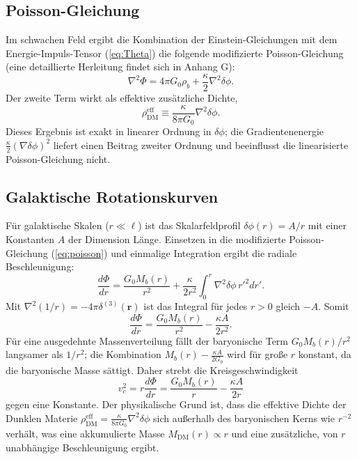 \documentclass[12pt,a4paper]{article}
\begin{document}
	\subsection{Poisson-Gleichung}
	Im schwachen Feld ergibt die Kombination der Einstein-Gleichungen mit dem Energie-Impuls-Tensor (\ref{eq:Theta}) die folgende modifizierte Poisson-Gleichung (eine detaillierte Herleitung findet sich in Anhang G):
	\begin{equation}
		\nabla^2 \Phi = 4\pi G_0 \rho_b + \frac{\kappa}{2} \nabla^2 \delta\phi.
		\label{eq:poisson}
	\end{equation}
	Der zweite Term wirkt als effektive zusätzliche Dichte,
	\begin{equation}
		\rho_{\mathrm{DM}}^{\mathrm{eff}} \equiv \frac{\kappa}{8\pi G_0} \nabla^2 \delta\phi.
		\label{eq:rhoDM}
	\end{equation}
	Dieses Ergebnis ist exakt in linearer Ordnung in \(\delta\phi\); die Gradientenenergie \(\frac{\kappa}{2}(\nabla\delta\phi)^2\) liefert einen Beitrag zweiter Ordnung und beeinflusst die linearisierte Poisson-Gleichung nicht.
	
	\subsection{Galaktische Rotationskurven}
	Für galaktische Skalen (\(r \ll \ell\)) ist das Skalarfeldprofil \(\delta\phi(r) = A/r\) mit einer Konstanten \(A\) der Dimension Länge. Einsetzen in die modifizierte Poisson-Gleichung (\ref{eq:poisson}) und einmalige Integration ergibt die radiale Beschleunigung:
	\[
	\frac{d\Phi}{dr} = \frac{G_0 M_b(r)}{r^2} + \frac{\kappa}{2r^2} \int_0^r \nabla^2\delta\phi \, r'^2 dr'.
	\]
	Mit \(\nabla^2(1/r) = -4\pi\delta^{(3)}(\mathbf{r})\) ist das Integral für jedes \(r>0\) gleich \(-A\). Somit
	\[
	\frac{d\Phi}{dr} = \frac{G_0 M_b(r)}{r^2} - \frac{\kappa A}{2r^2}.
	\]
	Für eine ausgedehnte Massenverteilung fällt der baryonische Term \(G_0 M_b(r)/r^2\) langsamer als \(1/r^2\); die Kombination \(M_b(r) - \frac{\kappa A}{2G_0}\) wird für große \(r\) konstant, da die baryonische Masse sättigt. Daher strebt die Kreisgeschwindigkeit
	\[
	v_c^2 = r\frac{d\Phi}{dr} = \frac{G_0 M_b(r)}{r} - \frac{\kappa A}{2r}
	\]
	gegen eine Konstante. Der physikalische Grund ist, dass die effektive Dichte der Dunklen Materie \(\rho_{\mathrm{DM}}^{\mathrm{eff}} = \frac{\kappa}{8\pi G_0} \nabla^2\delta\phi\) sich außerhalb des baryonischen Kerns wie \(r^{-2}\) verhält, was eine akkumulierte Masse \(M_{\mathrm{DM}}(r) \propto r\) und eine zusätzliche, von \(r\) unabhängige Beschleunigung ergibt.
	
\end{document}
